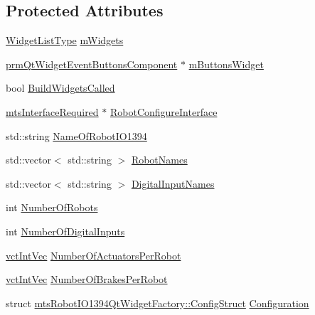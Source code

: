 \subsection*{Protected Attributes}
\begin{DoxyCompactItemize}
\item 
\hyperlink{classmts_robot_i_o1394_qt_widget_factory_aaa614e39fe48800dab4b21edf6845c22}{Widget\+List\+Type} \hyperlink{classmts_robot_i_o1394_qt_widget_factory_adaf0b9c315792eced9d1190bc3614fa8}{m\+Widgets}
\item 
\hyperlink{classprm_qt_widget_event_buttons_component}{prm\+Qt\+Widget\+Event\+Buttons\+Component} $\ast$ \hyperlink{classmts_robot_i_o1394_qt_widget_factory_a3eeee417f7939a43eeebe0d7624a5fb3}{m\+Buttons\+Widget}
\item 
bool \hyperlink{classmts_robot_i_o1394_qt_widget_factory_abc8f7a79cbc09c4f19a09654fc72fe4f}{Build\+Widgets\+Called}
\item 
\hyperlink{classmts_interface_required}{mts\+Interface\+Required} $\ast$ \hyperlink{classmts_robot_i_o1394_qt_widget_factory_a5456e298db56b3eb79c89bbbedd21846}{Robot\+Configure\+Interface}
\item 
std\+::string \hyperlink{classmts_robot_i_o1394_qt_widget_factory_a768d49c9080b3cdd9bfac4739011881e}{Name\+Of\+Robot\+I\+O1394}
\item 
std\+::vector$<$ std\+::string $>$ \hyperlink{classmts_robot_i_o1394_qt_widget_factory_ad869dbe413a4475f430975043773b5e9}{Robot\+Names}
\item 
std\+::vector$<$ std\+::string $>$ \hyperlink{classmts_robot_i_o1394_qt_widget_factory_a91c2107342e4c1ca2bdeefa374351e38}{Digital\+Input\+Names}
\item 
int \hyperlink{classmts_robot_i_o1394_qt_widget_factory_a12d58bb02a5e646dc4d901430db1753c}{Number\+Of\+Robots}
\item 
int \hyperlink{classmts_robot_i_o1394_qt_widget_factory_a76ca8abd91f3d9a0bd3aa6da7bd1deb3}{Number\+Of\+Digital\+Inputs}
\item 
\hyperlink{vct_dynamic_vector_types_8h_a47260df0b570a25352b3f318ed0b4c4e}{vct\+Int\+Vec} \hyperlink{classmts_robot_i_o1394_qt_widget_factory_a6a595f9b10a1a92194fa7619bbb08b80}{Number\+Of\+Actuators\+Per\+Robot}
\item 
\hyperlink{vct_dynamic_vector_types_8h_a47260df0b570a25352b3f318ed0b4c4e}{vct\+Int\+Vec} \hyperlink{classmts_robot_i_o1394_qt_widget_factory_a6a3a45284259fee4e32d6c2a2a1b864c}{Number\+Of\+Brakes\+Per\+Robot}
\item 
struct \hyperlink{structmts_robot_i_o1394_qt_widget_factory_1_1_config_struct}{mts\+Robot\+I\+O1394\+Qt\+Widget\+Factory\+::\+Config\+Struct} \hyperlink{classmts_robot_i_o1394_qt_widget_factory_a16b184d35dfa791f432a526a950569f9}{Configuration}
\end{DoxyCompactItemize}
